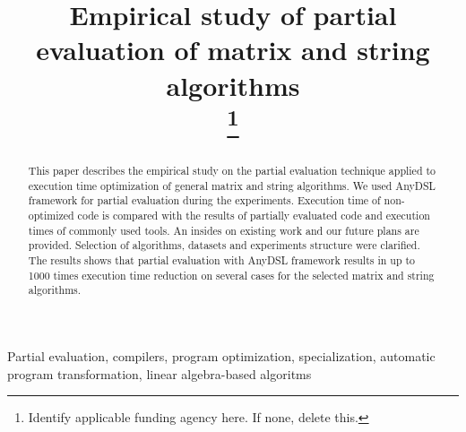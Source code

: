 \documentclass[conference]{IEEEtran}
\begin{document}
\title{Empirical study of partial evaluation of matrix and string algorithms\\

\thanks{Identify applicable funding agency here. If none, delete this.}
}

\author{
\and
{}
\and
{}
}
\maketitle

\begin{abstract}
	
This paper describes the empirical study on the partial evaluation technique applied to execution time optimization of general matrix and string algorithms. We used AnyDSL framework for partial evaluation during the experiments. Execution time of non-optimized code is compared with the results of partially evaluated code and execution times of commonly used tools. An insides on existing work and our future plans are provided. Selection of algorithms, datasets and experiments structure were clarified. The results shows that partial evaluation with AnyDSL framework results in up to 1000 times execution time reduction on several cases for the selected matrix and string algorithms.
	
\end{abstract}

\begin{IEEEkeywords}
Partial evaluation, compilers, program optimization, specialization, automatic program transformation, linear algebra-based algoritms
\end{IEEEkeywords}
\end{document}
